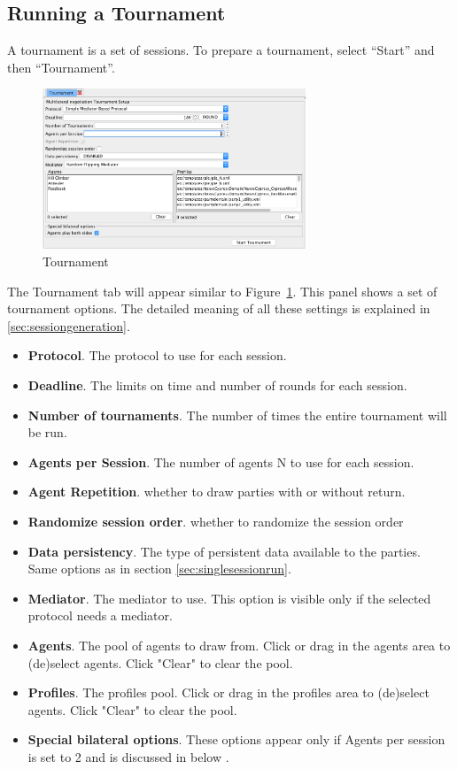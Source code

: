 \documentclass[]{article}
\begin{document}
\subsection{Running a Tournament}
A  tournament is a set of sessions. To prepare a tournament, select  ``Start'' and then ``Tournament''. 

\begin{figure}[htb]
	\centering
	\includegraphics[width=0.7\textwidth]{media/multipartytournament.png}
\caption{Tournament}\label{Fig:multipartytournament}
\end{figure}

The Tournament tab will appear similar to Figure~\ref{Fig:multipartytournament}. This panel shows a set of tournament options. The detailed meaning of all these settings is explained in \ref{sec:sessiongeneration}.

\begin{itemize}
	\item \textbf{Protocol}. The protocol to use for each session.
	\item \textbf{Deadline}. The limits on time and number of rounds for each session.
	\item \textbf{Number of tournaments}. The number of times the entire tournament will be run.
	\item \textbf{Agents per Session}. The number of agents N to use for each session.
	\item \textbf{Agent Repetition}. whether to draw parties with or without return.
	\item \textbf{Randomize session order}. whether to randomize the session order
	\item \textbf{Data persistency}. The type of persistent data available to the parties. Same options as in section \ref{sec:singlesessionrun}.
	\item \textbf{Mediator}. The mediator to use. This option is visible only if the selected protocol needs a mediator. 
	\item \textbf{Agents}. The pool of agents to draw from. Click or drag in the agents area to (de)select agents. Click "Clear" to clear the pool.
	\item \textbf{Profiles}. The profiles pool. Click or drag in the profiles area to (de)select agents. Click "Clear" to clear the pool.
	\item \textbf{Special bilateral options}. These options appear only if Agents per session is set to 2 and is discussed in below .
\end{itemize}
\end{document}
